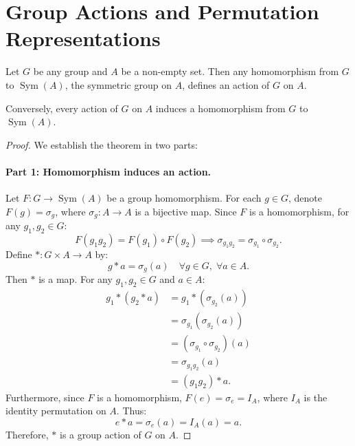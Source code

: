 \section{Group Actions and Permutation Representations}

\begin{theorem}
Let $G$ be any group and $A$ be a non-empty set. Then any homomorphism from $G$ to $\operatorname{Sym}(A)$, the symmetric group on $A$, defines an action of $G$ on $A$.

Conversely, every action of $G$ on $A$ induces a homomorphism from $G$ to $\operatorname{Sym}(A)$.
\end{theorem}

\begin{proof}
We establish the theorem in two parts:

\paragraph{Part 1: Homomorphism induces an action.}
Let $F : G \to \operatorname{Sym}(A)$ be a group homomorphism. For each $g \in G$, denote $F(g) = \sigma_g$, where $\sigma_g : A \to A$ is a bijective map. Since $F$ is a homomorphism, for any $g_1, g_2 \in G$:
\[
F(g_1 g_2) = F(g_1) \circ F(g_2) \implies \sigma_{g_1 g_2} = \sigma_{g_1} \circ \sigma_{g_2}.
\]
Define $* : G \times A \to A$ by:
\[
g * a = \sigma_g(a) \quad \forall g \in G, \; \forall a \in A.
\]
Then $*$ is a map. For any $g_1, g_2 \in G$ and $a \in A$:
\begin{align*}
g_1 * (g_2 * a) &= g_1 * (\sigma_{g_2}(a)) \\
&= \sigma_{g_1}(\sigma_{g_2}(a)) \\
&= (\sigma_{g_1} \circ \sigma_{g_2})(a) \\
&= \sigma_{g_1 g_2}(a) \\
&= (g_1 g_2) * a.
\end{align*}
Furthermore, since $F$ is a homomorphism, $F(e) = \sigma_e = I_A$, where $I_A$ is the identity permutation on $A$. Thus:
\[
e * a = \sigma_e(a) = I_A(a) = a.
\]
Therefore, $*$ is a group action of $G$ on $A$.


\end{proof}
